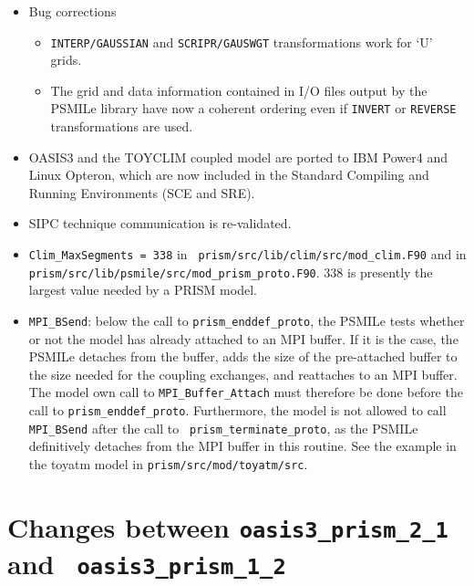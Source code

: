 \begin{itemize}

\item Bug corrections

 \begin{itemize}

 \item {\tt INTERP/GAUSSIAN} and {\tt SCRIPR/GAUSWGT} transformations
 work for `U' grids.

 \item The grid and data information contained in I/O files output by
 the PSMILe library have now a coherent ordering even if {\tt INVERT}
 or {\tt REVERSE} transformations are used.

 \end{itemize}

\item OASIS3 and the TOYCLIM coupled model are ported to IBM Power4 and
Linux Opteron, which are now included in the Standard Compiling and
Running Environments (SCE and SRE).

\item SIPC technique communication is re-validated.

\item {\tt Clim\_MaxSegments = 338} in {\tt
prism/src/lib/clim/src/mod\_clim.F90} and in {\tt
prism/src/lib/psmile/src/mod\_prism\_proto.F90}. 338 is presently the largest
value needed by a PRISM model. 

\item {\tt MPI\_BSend}: below the call to {\tt prism\_enddef\_proto},
the PSMILe tests whether or not the model has already attached to an
MPI buffer. If it is the case, the PSMILe detaches from the buffer,
adds the size of the pre-attached buffer to the size needed for the
coupling exchanges, and reattaches to an MPI buffer. The model own
call to {\tt MPI\_Buffer\_Attach} must therefore be done before the
call to {\tt prism\_enddef\_proto}. Furthermore, the model is not
allowed to call {\tt MPI\_BSend} after the call to {\tt
prism\_terminate\_proto}, as the PSMILe definitively detaches from the
MPI buffer in this routine. See the example in the toyatm model in
{\tt prism/src/mod/toyatm/src}.

\end{itemize}

\section{Changes between {\tt oasis3\_prism\_2\_1} and {\tt
oasis3\_prism\_1\_2}}

